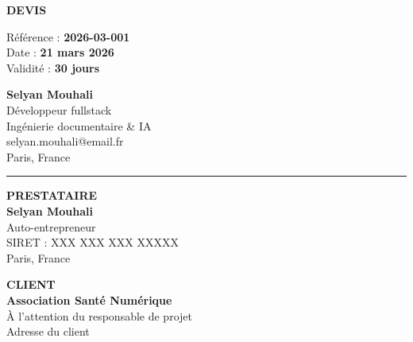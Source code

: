 \documentclass[12pt, a4paper]{article}
\begin{document}
\thispagestyle{empty}

\begin{minipage}[t]{0.55\textwidth}
\vspace{0pt}
{\LARGE\bfseries\textcolor{bleuprofond}{DEVIS}}

\vspace{0.3cm}

{\small\textcolor{gris400}{R\'ef\'erence :} \textbf{2026-03-001}}\\
{\small\textcolor{gris400}{Date :} \textbf{21 mars 2026}}\\
{\small\textcolor{gris400}{Validit\'e :} \textbf{30 jours}}
\end{minipage}%
\hfill
\begin{minipage}[t]{0.40\textwidth}
\vspace{0pt}
\raggedleft
{\large\bfseries\textcolor{bleuprofond}{Selyan Mouhali}}\\[0.3em]
{\small\textcolor{gris600}{D\'eveloppeur fullstack}\\
\textcolor{gris600}{Ing\'enierie documentaire \& IA}\\[0.3em]
\textcolor{gris400}{selyan.mouhali@email.fr}\\
\textcolor{gris400}{Paris, France}}
\end{minipage}

\vspace{0.8cm}
\textcolor{bleuaccent}{\rule{\textwidth}{2pt}}
\vspace{0.8cm}

\begin{minipage}[t]{0.48\textwidth}
{\small\textcolor{gris400}{\quad\textbf{PRESTATAIRE}}}\\[0.4em]
\textbf{Selyan Mouhali}\\
{\small Auto-entrepreneur\\
SIRET : XXX XXX XXX XXXXX\\
Paris, France}
\end{minipage}%
\hfill
\begin{minipage}[t]{0.48\textwidth}
{\small\textcolor{gris400}{\quad\textbf{CLIENT}}}\\[0.4em]
\textbf{Association Sant\'e Num\'erique}\\
{\small \`A l'attention du responsable de projet\\[0.3em]
\textcolor{gris400}{Adresse du client}}
\end{minipage}
\end{document}
